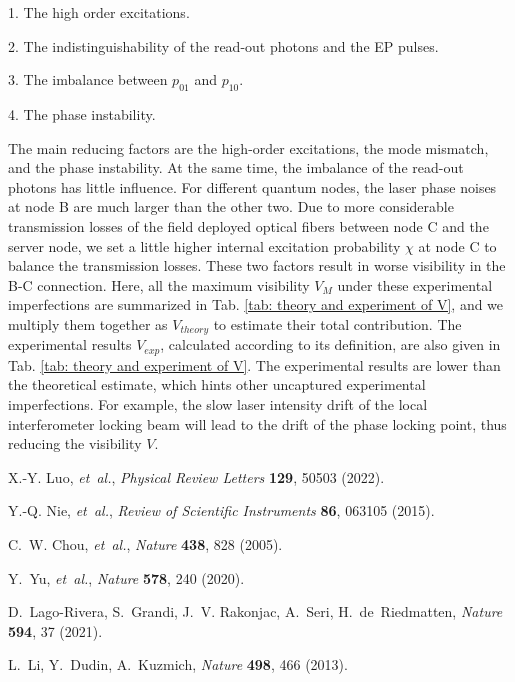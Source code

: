 \documentclass[aps,reprint,showpacs,superscriptaddress]{revtex4-2}
\begin{document}
1. The high order excitations.

2. The indistinguishability of the read-out photons and the EP pulses.

3. The imbalance between $p_{01}$ and $p_{10}$.

4. The phase instability.

The main reducing factors are the high-order excitations, the mode mismatch, and the phase instability. At the same time, the imbalance of the read-out photons has little influence. For different quantum nodes, the laser phase noises at node B are much larger than the other two. Due to  more considerable transmission losses of the field deployed optical fibers between node C and the server node, we set a little higher internal excitation probability $\chi$  at node C to balance the transmission losses. These two factors result in worse visibility in the B-C connection. Here, all the maximum visibility $V_M$ under these experimental imperfections are summarized in Tab. \ref{tab: theory and experiment of V}, and we multiply them together as $V_{theory}$ to estimate their total contribution. The experimental results $V_{exp}$, calculated  according to its definition, are also given in Tab. \ref{tab: theory and experiment of V}.
The experimental results are lower than the theoretical estimate, which hints other uncaptured experimental imperfections. For example, the slow laser intensity drift of the local interferometer locking beam will lead to the drift of the phase locking point, thus reducing the visibility $V$.

% 
\begin{thebibliography}{1}

	X.-Y. Luo, {\it et~al.\/}, {\it Physical Review Letters\/} {\bf 129}, 50503
	  (2022).
	
	Y.-Q. Nie, {\it et~al.\/}, {\it Review of Scientific Instruments\/} {\bf 86},
	   063105 (2015).
	
	C.~W. Chou, {\it et~al.\/}, {\it Nature\/} {\bf 438}, 828 (2005).
	
	Y.~Yu, {\it et~al.\/}, {\it Nature\/} {\bf 578}, 240 (2020).
	
	D.~Lago-Rivera, S.~Grandi, J.~V. Rakonjac, A.~Seri, H.~de~Riedmatten, {\it
	  Nature\/} {\bf 594}, 37 (2021).
	
	L.~Li, Y.~Dudin, A.~Kuzmich, {\it Nature\/} {\bf 498}, 466 (2013).
	
\end{thebibliography}



	
\end{document}
